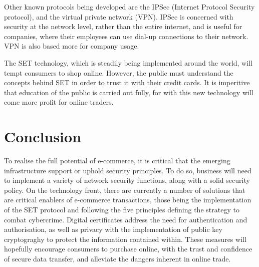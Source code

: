 \documentclass[11pt,a4paper,twoside,notitlepage]{article}
\begin{document}
Other known protocols being developed are the 
IPSec (Internet Protocol Security protocol), and the virtual private network (VPN). 
IPSec is concerned with security at the network level, rather than the entire internet, and is useful for companies, where their employees can use dial-up connections to their network.
VPN is also based more for company usage.

The SET technology, which is steadily being implemented around the world, will tempt consumers to shop online.  However, the public must understand the concepts behind SET in order to trust it with their credit cards.  It is imperitive that education of the public is carried out fully, for with this new technology will come more profit for online traders.


\section*{Conclusion}
To realise the full potential of e-commerce, it is critical that the emerging infrastructure support or 
uphold security principles.
To do so, business will need to implement a variety of network security functions, along with a solid security
policy.
On the technology front, there are currently a number of solutions that are critical enablers of e-commerce
transactions, those being the implementation of the SET protocol and following the five
principles defining the strategy to combat cybercrime.
Digital certificates address the need for authentication and authorisation, as well as privacy with the implementation
of public key cryptograghy to protect the information contained within.
These measures will hopefully encourage consumers to purchase online, with the trust and confidence of secure data transfer, and alleviate the dangers inherent in online trade.



\end{document}
